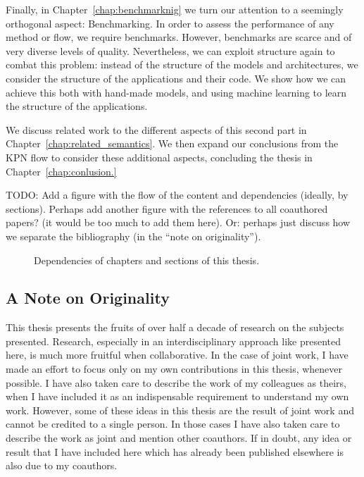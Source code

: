 Finally, in Chapter~\ref{chap:benchmarknig} we turn our attention to a seemingly orthogonal aspect: Benchmarking.
In order to assess the performance of any method or flow, we require benchmarks.
However, benchmarks are scarce and of very diverse levels of quality.
Nevertheless, we can exploit structure again to combat this problem: instead of the structure of the models and architectures, we consider the structure of the applications and their code.
We show how we can achieve this both with hand-made models, and using machine learning to learn the structure of the applications.

We discuss related work to the different aspects of this second part in Chapter~\ref{chap:related_semantics}.
We then expand our conclusions from the \ac{KPN} flow to consider these additional aspects, concluding the thesis in Chapter~\ref{chap:conlusion.}

TODO: Add a figure with the flow of the content and dependencies (ideally, by sections). Perhaps add another figure with the references to all coauthored papers? (it would be too much to add them here). Or: perhaps just discuss how we separate the bibliography (in the ``note on originality'').

\begin{figure}[h]
	\centering
   \resizebox{0.95\textwidth}{!}{}
   \caption{Dependencies of chapters and sections of this thesis.}
	\label{fig:multicore_era}
\end{figure}


\subsection{A Note on Originality}

This thesis presents the fruits of over half a decade of research on the subjects presented.
Research, especially in an interdisciplinary approach like presented here, is much more fruitful when collaborative.
In the case of joint work, I have made an effort to focus only on my own contributions in this thesis, whenever possible.
I have also taken care to describe the work of my colleagues as theirs, when I have included it as an indispensable requirement to understand my own work.
However, some of these ideas in this thesis are the result of joint work and cannot be credited to a single person.
In those cases I have also taken care to describe the work as joint and mention other coauthors.
If in doubt, any idea or result that I have included here which has already been published elsewhere is also due to my coauthors.


